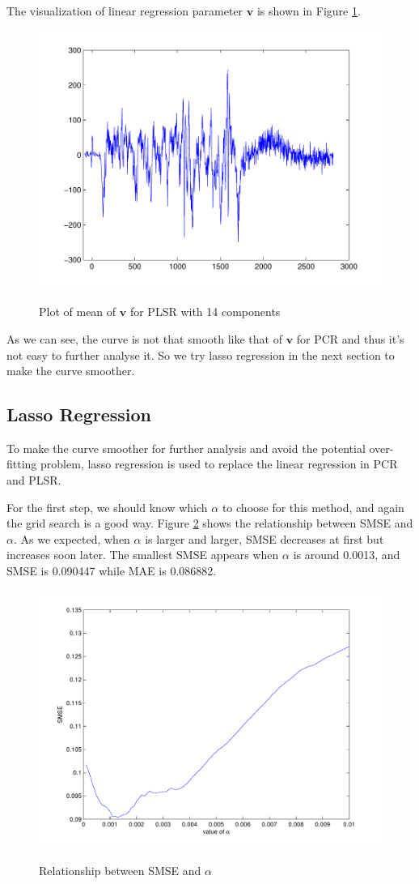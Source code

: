 \documentclass[a4paper]{article}
\newcommand{\bfv}{\mathbf{v}}
\begin{document}
The visualization of linear regression parameter $\bfv$ is shown in Figure \ref{pic7}.
\begin{figure}[h]
  \centering
  \includegraphics[width=.6\textwidth]{images/v_PLSR.pdf}\\
  \caption{Plot of mean of $\bfv$ for PLSR with 14 components}\label{pic7}
\end{figure}

As we can see, the curve is not that smooth like that of $\bfv$ for PCR and thus it's not easy to further analyse it. So we try lasso regression in the next section to make the curve smoother. 

\newpage
\subsection{Lasso Regression}
To make the curve smoother for further analysis and avoid the potential over-fitting problem, lasso regression is used to replace the linear regression in PCR and PLSR.

For the first step, we should know which $\alpha$ to choose for this method, and again the grid search is a good way. Figure \ref{pic_lasso1} shows the relationship between SMSE and $\alpha$. As we expected, when $\alpha$ is larger and larger, SMSE decreases at first but increases soon later. The smallest SMSE appears when $\alpha$ is around 0.0013, and SMSE is 0.090447 while MAE is 0.086882.
\begin{figure}[h]
  \centering
  \includegraphics[width=.6\textwidth]{images/lasso_new.pdf}\\
  \caption{Relationship between SMSE and $\alpha$}\label{pic_lasso1}
\end{figure}
\end{document}
